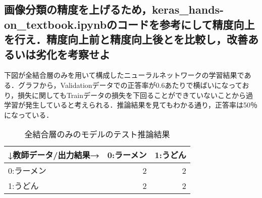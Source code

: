 \documentclass[uplatex,titlepage]{jsarticle}
\newif\iffigure
\begin{document}
\subsection{画像分類の精度を上げるため，keras\_hands-on\_textbook.ipynbのコードを参考にして精度向上を行え．精度向上前と精度向上後とを比較し，改善あるいは劣化を考察せよ}
下図が全結合層のみを用いて構成したニューラルネットワークの学習結果である．グラフから，Validationデータでの正答率が0.6あたりで横ばいになっており，損失に関してもTrainデータの損失を下回ることができていないことから過学習が発生していると考えられる．推論結果を見てもわかる通り，正答率は50％になっている．
\iffigure
\begin{figure}[H]
\begin{minipage}{8cm}%
  \begin{center}
    \texttt{[image: ker\_FCL\_acc.png]} \\
    \caption{全結合層のみのモデルの正答率の推移}
  \end{center}
\end{minipage}
\hfill
\begin{minipage}{8cm}%
  \begin{center}
    \texttt{[image: ker\_FCL\_loss.png]} \\
    \caption{全結合層のみのモデルの損失の推移}
  \end{center}
\end{minipage}
\end{figure}
\fi
\begin{table}[H]
  \begin{center}
    \caption{全結合層のみのモデルのテスト推論結果}
    \begin{tabular}[t]{|l|r|r|}
    \hline
    ↓教師データ/出力結果→ & 0:ラーメン & 1:うどん \\ \hline \hline
    0:ラーメン & 2 & 2 \\ \hline
    1:うどん & 2 & 2 \\ \hline
    \end{tabular}
  \end{center}
\end{table}
\end{document}

